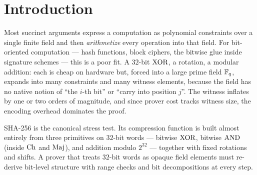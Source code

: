 \section{Introduction}
\label{sec:intro}

Most succinct arguments express a computation as polynomial constraints
over a single finite field and then \emph{arithmetize} every operation
into that field. For bit-oriented computation --- hash functions, block
ciphers, the bitwise glue inside signature schemes --- this is a poor
fit. A $32$-bit $\operatorname{XOR}$, a rotation, a modular addition: each is cheap on
hardware but, forced into a large prime field $\mathbb{F}_q$, expands into many
constraints and many witness elements, because the field has no native
notion of ``the $i$-th bit'' or ``carry into position $j$''. The witness
inflates by one or two orders of magnitude, and since prover cost tracks
witness size, the encoding overhead dominates the proof.

SHA-256 is the canonical stress test. Its compression function is built
almost entirely from three primitives on $32$-bit words --- bitwise
$\operatorname{XOR}$, bitwise $\operatorname{AND}$ (inside $\operatorname{Ch}$ and $\operatorname{Maj}$), and addition modulo
$2^{32}$ --- together with fixed rotations and shifts. A prover that
treats $32$-bit words as opaque field elements must re-derive bit-level
structure with range checks and bit decompositions at every step.

